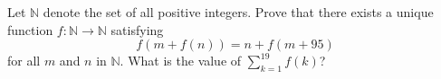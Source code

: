 Let $\mathbb{N}$ denote the set of all positive integers. Prove that there exists a unique function $f : \mathbb{N} \to \mathbb{N}$ satisfying
\[ f(m + f(n)) = n + f(m + 95) \]
for all $m$ and $n$ in $\mathbb{N}$. What is the value of $\sum_{k=1}^{19} f(k)$?
